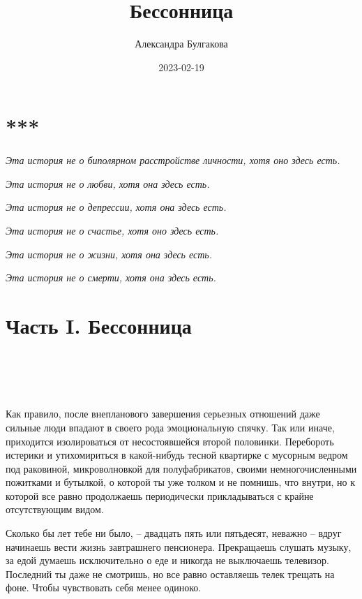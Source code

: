 \documentclass[
]{book}
\title{Бессонница}
\author{Александра Булгакова}
\date{2023-02-19}
\begin{document}
\maketitle

{
\setcounter{tocdepth}{1}
\tableofcontents
}
\hypertarget{section}{%
\chapter*{***}\label{section}}

\emph{Эта история не о биполярном расстройстве личности, хотя оно здесь есть.}

\emph{Эта история не о любви, хотя она здесь есть.}

\emph{Эта история не о депрессии, хотя она здесь есть.}

\emph{Эта история не о счастье, хотя оно здесь есть.}

\emph{Эта история не о жизни, хотя она здесь есть.}

\emph{Эта история не о смерти, хотя она здесь есть.}

\hypertarget{ux447ux430ux441ux442ux44c-i.-ux431ux435ux441ux441ux43eux43dux43dux438ux446ux430}{%
\chapter*{Часть I. Бессонница}\label{ux447ux430ux441ux442ux44c-i.-ux431ux435ux441ux441ux43eux43dux43dux438ux446ux430}}

\hypertarget{chapter-1}{%
\chapter{~}\label{chapter-1}}

Как правило, после внепланового завершения серьезных отношений даже сильные люди впадают в своего рода эмоциональную спячку. Так или иначе, приходится изолироваться от несостоявшейся второй половинки. Перебороть истерики и утихомириться в какой-нибудь тесной квартирке с мусорным ведром под раковиной, микроволновкой для полуфабрикатов, своими немногочисленными пожитками и бутылкой, о которой ты уже толком и не помнишь, что внутри, но к которой все равно продолжаешь периодически прикладываться с крайне отсутствующим видом.

Сколько бы лет тебе ни было, -- двадцать пять или пятьдесят, неважно -- вдруг начинаешь вести жизнь завтрашнего пенсионера. Прекращаешь слушать музыку, за едой думаешь исключительно о еде и никогда не выключаешь телевизор. Последний ты даже не смотришь, но все равно оставляешь телек трещать на фоне. Чтобы чувствовать себя менее одиноко.
\end{document}
